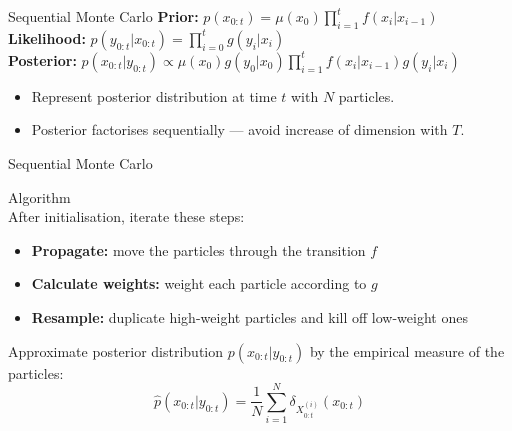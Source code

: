 \documentclass[aspectratio=169]{beamer}
\theoremstyle{definition}
\begin{document}
\begin{frame}{Sequential Monte Carlo}
\textbf{Prior: }
$p(x_{0:t}) = \mu(x_0) \prod_{i=1}^t f(x_i | x_{i-1})$ \\[7pt]
\textbf{Likelihood: }
$p(y_{0:t} | x_{0:t}) = \prod_{i=0}^t g(y_i | x_i)$ \\[7pt]
\textbf{Posterior: }
$p(x_{0:t} | y_{0:t}) \propto \mu(x_0) g(y_0 | x_0) \prod_{i=1}^t f(x_i | x_{i-1}) g(y_i | x_i)$\\[12pt]
\begin{itemize}
\item Represent posterior distribution at time $t$ with $N$ particles.\\[7pt]
\item Posterior factorises sequentially --- avoid increase of dimension with $T$.
\end{itemize}
\end{frame}

\begin{frame}{Sequential Monte Carlo}

{\Large Algorithm}\\
After initialisation, iterate these steps:
\begin{itemize}
\item \textbf{Propagate:} move the particles through the transition $f$
\item \textbf{Calculate weights:} weight each particle according to $g$
\item \textbf{Resample:} duplicate high-weight particles and kill off low-weight ones \\[12pt]
\end{itemize}
Approximate posterior distribution $p(x_{0:t} | y_{0:t})$ by the empirical measure of the particles:
\begin{equation*}
\hat{p}(x_{0:t}|y_{0:t}) = \frac{1}{N} \sum_{i=1}^N \delta_{X_{0:t}^{(i)}} (x_{0:t})
\end{equation*}
\end{frame}
\end{document}
